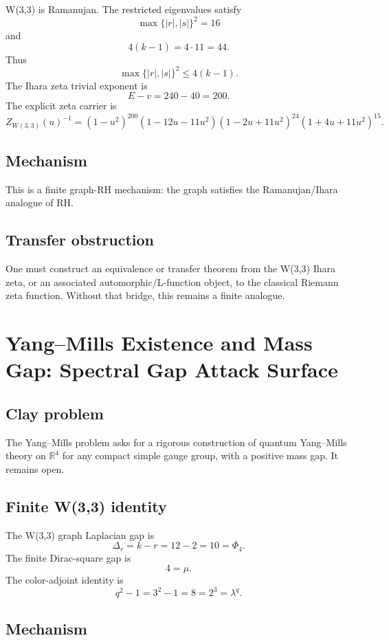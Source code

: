 \documentclass[11pt]{article}
\theoremstyle{definition}
\newcommand{\W}{W(3,3)}
\newcommand{\R}{\mathbb{R}}
\newcommand{\PhiFour}{\Phi_4}
\newcommand{\Deltar}{\Delta_r}
\begin{document}
W(3,3) is Ramanujan.  The restricted eigenvalues satisfy
\[
  \max\{|r|,|s|\}^2=16
\]
and
\[
  4(k-1)=4\cdot11=44.
\]
Thus
\[
  \max\{|r|,|s|\}^2\leq 4(k-1).
\]
The Ihara zeta trivial exponent is
\[
  E-v=240-40=200.
\]
The explicit zeta carrier is
\[
Z_{\W}(u)^{-1}=(1-u^2)^{200}(1-12u-11u^2)(1-2u+11u^2)^{24}(1+4u+11u^2)^{15}.
\]

\subsection{Mechanism}

This is a finite graph-RH mechanism: the graph satisfies the Ramanujan/Ihara analogue of RH.

\subsection{Transfer obstruction}

One must construct an equivalence or transfer theorem from the W(3,3) Ihara zeta, or an associated automorphic/L-function object, to the classical Riemann zeta function.  Without that bridge, this remains a finite analogue.

\section{Yang--Mills Existence and Mass Gap: Spectral Gap Attack Surface}

\subsection{Clay problem}

The Yang--Mills problem asks for a rigorous construction of quantum Yang--Mills theory on \(\R^4\) for any compact simple gauge group, with a positive mass gap.  It remains open.

\subsection{Finite W(3,3) identity}

The W(3,3) graph Laplacian gap is
\[
  \Deltar=k-r=12-2=10=\PhiFour.
\]
The finite Dirac-square gap is
\[
  4=\mu.
\]
The color-adjoint identity is
\[
  q^2-1=3^2-1=8=2^3=\lambda^q.
\]

\subsection{Mechanism}
\end{document}
